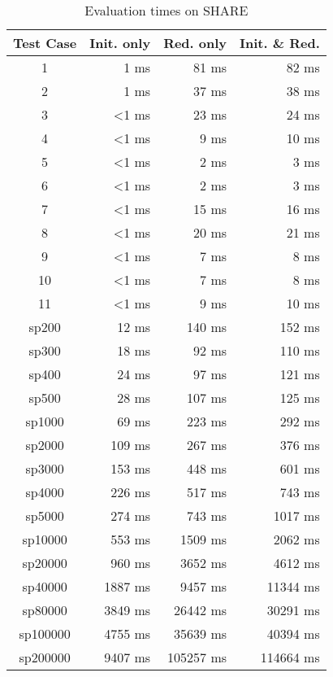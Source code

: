 \documentclass[submission]{eptcs}
\begin{document}
\begin{table}[H]
  \centering
  \begin{tabular}{| c | r | r |r |}
    \hline
    \textbf{Test Case} & \textbf{Init. only} & \textbf{Red. only} & \textbf{Init. \& Red.}\\
    \hline
    1        & 1 ms    & 81 ms & 82 ms\\
    2        & 1 ms    & 37 ms & 38 ms\\
    3        & <1 ms   & 23 ms & 24 ms\\
    4        & <1 ms   & 9 ms & 10 ms\\
    5        & <1 ms   & 2 ms  & 3 ms\\
    6        & <1 ms   & 2 ms  & 3 ms\\
    7        & <1 ms   & 15 ms & 16 ms\\
    8        & <1 ms   & 20 ms & 21 ms\\
    9        & <1 ms   & 7 ms  & 8 ms\\
    10       & <1 ms   & 7 ms  & 8 ms\\
    11       & <1 ms   & 9 ms  & 10 ms\\
    \hline
    sp200    & 12 ms   & 140 ms    & 152 ms\\
    sp300    & 18 ms   & 92 ms     & 110 ms\\
    sp400    & 24 ms   & 97 ms     & 121 ms\\
    sp500    & 28 ms   & 107 ms    & 125 ms\\
    sp1000   & 69 ms   & 223 ms    & 292 ms\\
    sp2000   & 109 ms  & 267 ms    & 376 ms\\
    sp3000   & 153 ms  & 448 ms    & 601 ms\\
    sp4000   & 226 ms  & 517 ms    & 743 ms\\
    sp5000   & 274 ms  & 743 ms    & 1017 ms\\
    sp10000  & 553 ms  & 1509 ms   & 2062 ms\\
    sp20000  & 960 ms  & 3652 ms   & 4612 ms\\
    sp40000  & 1887 ms & 9457 ms   & 11344 ms\\
    sp80000  & 3849 ms & 26442 ms  & 30291 ms\\
    sp100000 & 4755 ms & 35639 ms  & 40394 ms\\
    sp200000 & 9407 ms & 105257 ms & 114664 ms\\
    \hline
  \end{tabular}
  \caption{Evaluation times on SHARE}
  \label{tab:eval-times}
\end{table}
\end{document}
